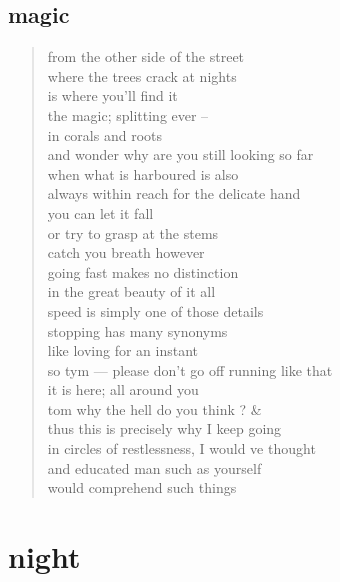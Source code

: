 \documentclass[11pt]{article}
\begin{document}
\subsection{magic}
\label{sec:org5ae97d0}
\begin{verse}
from the other side of the street\\
where the trees crack at nights\\
is where you'll find it\\
the magic; splitting ever --\\
in corals and roots\\
and wonder why are you still looking so far\\
when what is harboured is also\\
always within reach for the delicate hand\\
\vspace*{1em}
you can let it fall\\
or try to grasp at the stems\\
catch you breath however\\
going fast makes no distinction\\
in the great beauty of it all\\
speed is simply one of those details\\
\vspace*{1em}
stopping has many synonyms\\
like loving for an instant\\
so tym --- please don't go off running like that\\
it is here; all around you\\
tom why the hell do you think ? \&\\
thus this is precisely why I keep going\\
in circles of restlessness, I would ve thought\\
and educated man such as yourself\\
would comprehend such things\\
\end{verse}
\section{night}
\label{sec:orga74a24d}
\end{document}
